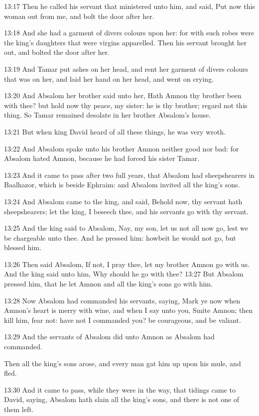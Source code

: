 13:17 Then he called his servant that ministered unto him, and said, Put now this woman out from me, and bolt the door after her.

13:18 And she had a garment of divers colours upon her: for with such robes were the king's daughters that were virgins apparelled. Then his servant brought her out, and bolted the door after her.

13:19 And Tamar put ashes on her head, and rent her garment of divers colours that was on her, and laid her hand on her head, and went on crying.

13:20 And Absalom her brother said unto her, Hath Amnon thy brother been with thee? but hold now thy peace, my sister: he is thy brother; regard not this thing. So Tamar remained desolate in her brother Absalom's house.

13:21 But when king David heard of all these things, he was very wroth.

13:22 And Absalom spake unto his brother Amnon neither good nor bad: for Absalom hated Amnon, because he had forced his sister Tamar.

13:23 And it came to pass after two full years, that Absalom had sheepshearers in Baalhazor, which is beside Ephraim: and Absalom invited all the king's sons.

13:24 And Absalom came to the king, and said, Behold now, thy servant hath sheepshearers; let the king, I beseech thee, and his servants go with thy servant.

13:25 And the king said to Absalom, Nay, my son, let us not all now go, lest we be chargeable unto thee. And he pressed him: howbeit he would not go, but blessed him.

13:26 Then said Absalom, If not, I pray thee, let my brother Amnon go with us. And the king said unto him, Why should he go with thee?  13:27 But Absalom pressed him, that he let Amnon and all the king's sons go with him.

13:28 Now Absalom had commanded his servants, saying, Mark ye now when Amnon's heart is merry with wine, and when I say unto you, Smite Amnon; then kill him, fear not: have not I commanded you? be courageous, and be valiant.

13:29 And the servants of Absalom did unto Amnon as Absalom had commanded.

Then all the king's sons arose, and every man gat him up upon his mule, and fled.

13:30 And it came to pass, while they were in the way, that tidings came to David, saying, Absalom hath slain all the king's sons, and there is not one of them left.

